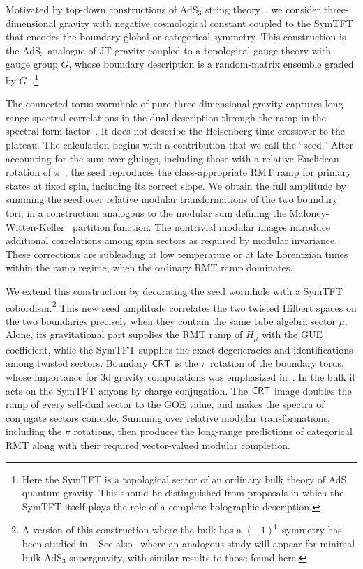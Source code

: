 \documentclass[11pt]{article}
\numberwithin{equation}{section}
\begin{document}
Motivated by top-down constructions of AdS$_3$ string theory~\cite{Kraus:2006wn}, we consider three-dimensional gravity with negative cosmological constant coupled to the SymTFT that encodes the boundary global or categorical symmetry. This construction is the AdS$_3$ analogue of JT gravity coupled to a topological gauge theory with gauge group $G$, whose boundary description is a random-matrix ensemble graded by $G$~\cite{Kapec:2019ecr}.\footnote{Here the SymTFT is a topological sector of an ordinary bulk theory of AdS quantum gravity. This should be distinguished from proposals in which the SymTFT itself plays the role of a complete holographic description.}

The connected torus wormhole of pure three-dimensional gravity captures long-range spectral correlations in the dual description through the ramp in the spectral form factor~\cite{Cotler:2020ugk}. It does not describe the Heisenberg-time crossover to the plateau. The calculation begins with a contribution that we call the ``seed.'' After accounting for the sum over gluings, including those with a relative Euclidean rotation of $\pi$~\cite{Yan:2023rjh}, the seed reproduces the class-appropriate RMT ramp for primary states at fixed spin, including its correct slope. We obtain the full amplitude by summing the seed over relative modular transformations of the two boundary tori, in a construction analogous to the modular sum defining the Maloney-Witten-Keller~\cite{Maloney:2007ud,Keller:2014xba} partition function. The nontrivial modular images introduce additional correlations among spin sectors as required by modular invariance. These corrections are subleading at low temperature or at late Lorentzian times within the ramp regime, when the ordinary RMT ramp dominates.

We extend this construction by decorating the seed wormhole with a SymTFT cobordism.\footnote{A version of this construction where the bulk has a $(-1)^{\mathsf{F}}$ symmetry has been studied in~\cite{Boruch:2026hbr}. See also~\cite{SUGRA} where an analogous study will appear for minimal bulk AdS$_3$ supergravity, with similar results to those found here.} This new seed amplitude correlates the two twisted Hilbert spaces on the two boundaries precisely when they contain the same tube algebra sector $\mu$. Alone, its gravitational part supplies the RMT ramp of $H_\mu$ with the GUE coefficient, while the SymTFT supplies the exact degeneracies and identifications among twisted sectors. Boundary $\mathsf{CRT}$ is the $\pi$ rotation of the boundary torus, whose importance for 3d gravity computations was emphasized in~\cite{Yan:2023rjh,Harlow:2023hjb}. In the bulk it acts on the SymTFT anyons by charge conjugation. The $\mathsf{CRT}$ image doubles the ramp of every self-dual sector to the GOE value, and makes the spectra of conjugate sectors coincide. Summing over relative modular transformations, including the $\pi$ rotations, then produces the long-range predictions of categorical RMT along with their required vector-valued modular completion. 
\end{document}
